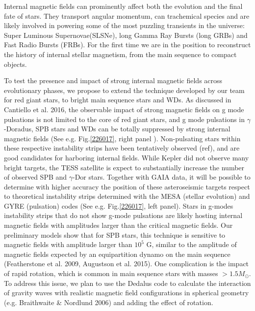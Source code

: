 Internal magnetic fields can prominently affect both the evolution and the final fate of stars. They transport angular momentum, can trachemical species
and are likely involved in powering some of the most puzzling transients in the universe: Super Luminous Supernovae(SLSNe), long Gamma Ray Bursts (long GRBs) and Fast Radio Bursts (FRBs).
For the first time we are in the position to reconstruct the history of internal stellar magnetism, from the main sequence to compact objects.

To test the presence and impact of strong internal magnetic fields across evolutionary phases,
we propose to extend the technique developed by our team for red giant stars, to bright main sequence stars and WDs.
As discussed in Cantiello et al. 2016, the observable impact of strong magnetic fields on g mode pulsations is not limited to the core of red giant stars, and
 g mode pulsations in $\gamma$-Doradus, SPB stars and WDs can be totally suppressed by strong internal magnetic fields (See e.g. Fig.\ref{226017}, right panel ).
Non-pulsating stars within these respective instability strips have been tentatively observed (ref), and are good candidates for harboring internal fields.
While Kepler did not observe many bright targets, the TESS satellite is expect to substantially increase the number of observed SPB and $\gamma$-Dor stars.
Together with GAIA data, it will be possible to determine with higher accuracy the position of these asteroseismic targets respect to
theoretical instability strips determined with the MESA (stellar evolution) and GYRE (pulsation) codes (See e.g. Fig.\ref{226017}, left panel).
Stars in g-modes instability strips that do not show g-mode pulsations are likely hosting internal magnetic fields with amplitudes larger than the critical
magnetic fields. Our preliminary models show that for SPB stars, this technique is sensitive to magnetic fields with amplitude larger than $10^5$ G,
similar to the amplitude of magnetic fields expected by an equipartition dynamo on the main sequence (Featherstone et al. 2009, Augustson et al. 2015).
One complication is the impact of rapid rotation, which is common in main sequence stars with masses $> 1.5M_\odot$. To address this issue,
we plan to use the Dedalus code to calculate the interaction of gravity waves with realistic magnetic field configurations in spherical geometry (e.g. Braithwaite \& Nordlund 2006)
and adding the effect of rotation.

